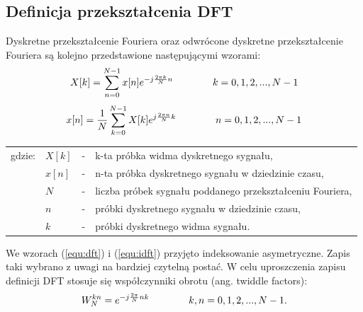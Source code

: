\subsection{Definicja przekształcenia DFT}
Dyskretne przekształcenie Fouriera oraz odwrócone dyskretne przekształcenie Fouriera są kolejno przedstawione następującymi wzorami:
\begin{equation} \label{equ:dft}
\openup\jot
\begin{aligned}[t]
X[k] = \sum_{n=0}^{N-1} x[n]e^{-j\frac{2\pi k}{N}n} \\ 
\end{aligned}
\qquad\qquad %
\begin{aligned}[t]
k = 0, 1, 2, ..., N - 1 \\
\end{aligned}
\end{equation}
\begin{equation} \label{equ:idft}
\openup\jot
\begin{aligned}[t]
x[n] = \frac{1}{N}\sum_{k=0}^{N-1} X[k]e^{j\frac{2\pi n}{N}k}  \\  
\end{aligned}
\qquad\qquad %
\begin{aligned}[t]
 n = 0, 1, 2, ..., N - 1 \\
 \end{aligned}
\end{equation}
\begin{tabular}{ l l l l}
	gdzie: & $X[k]$ &  - & k-ta próbka widma dyskretnego sygnału, \\
	&	$x[n]$ & - &  n-ta próbka dyskretnego sygnału w dziedzinie czasu, \\
	&	$N$ & - &  liczba próbek sygnału poddanego przekształceniu Fouriera,\\
	&	$n$ & - &  próbki dyskretnego sygnału w dziedzinie czasu, \\
	&	$k$ & - &  próbki dyskretnego widma sygnału. \\
\end{tabular}

We wzorach (\ref{equ:dft}) i (\ref{equ:idft}) przyjęto indeksowanie asymetryczne. Zapis taki wybrano z uwagi na bardziej czytelną postać. W celu uproszczenia zapisu definicji DFT stosuje się współczynniki obrotu (ang. twiddle factors):
\begin{equation} \label{equ:twid_fact}
\openup\jot
\begin{aligned}[t]
	W_{N}^{kn} = e^{-j\frac{2\pi}{N}nk}  \\
\end{aligned}
\qquad\qquad %
\begin{aligned}[t]
   k, n = 0, 1, 2, ..., N - 1. \\
\end{aligned}
\end{equation}

